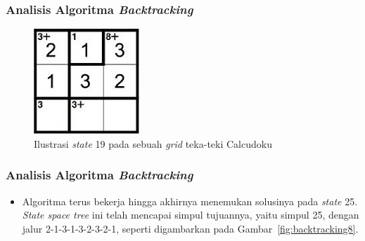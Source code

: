 \documentclass{beamer}
\begin{document}
\begin{frame}
\frametitle{Analisis Algoritma \textit{Backtracking}}
\begin{figure}
\centering
\captionsetup{justification=centering}
\includegraphics[scale=1]{Gambar/Backtracking6}
\caption[Ilustrasi \textit{state} 19 pada sebuah \textit{grid} teka-teki Calcudoku]{Ilustrasi \textit{state} 19 pada sebuah \textit{grid} teka-teki Calcudoku}
\label{fig:backtracking6}
\end{figure}
\end{frame}

\note{

}

\begin{frame}
\frametitle{Analisis Algoritma \textit{Backtracking}}
\begin{itemize}
\item Algoritma terus bekerja hingga akhirnya menemukan solusinya pada \textit{state} 25.
\textit{State space tree} ini telah mencapai simpul tujuannya, yaitu simpul 25, dengan jalur 2-1-3-1-3-2-3-2-1, seperti digambarkan pada Gambar~\ref{fig:backtracking8}.
\end{itemize}
\end{frame}

\end{document}
